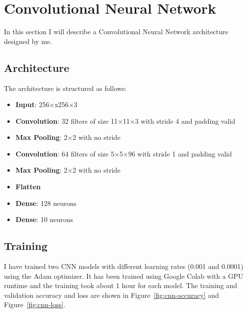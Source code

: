 \section{Convolutional Neural Network}\label{sec:cnn}
In this section I will describe a Convolutional Neural Network architecture designed by me.

\subsection{Architecture}\label{sec:cnn-architecture}
The architecture is structured as follows:
\begin{itemize}
    \item \textbf{Input}: 256$\times$x256$\times$3
    \item \textbf{Convolution}: 32 filters of size 11$\times$11$\times$3 with stride 4 and padding valid
    \item \textbf{Max Pooling}: 2$\times$2 with no stride
    \item \textbf{Convolution}: 64 filters of size 5$\times$5$\times$96 with stride 1 and padding valid
    \item \textbf{Max Pooling}: 2$\times$2 with no stride
    \item \textbf{Flatten}
    \item \textbf{Dense}: 128 neurons
    \item \textbf{Dense}: 10 neurons
\end{itemize}

\subsection{Training}\label{sec:cnn-training}
I have trained two CNN models with different learning rates (0.001 and 0.0001) using the Adam optimizer.
It has been trained using Google Colab with a GPU runtime and the training took about 1 hour for each model.
The training and validation accuracy and loss are shown in Figure~\ref{fig:cnn-accuracy} and Figure~\ref{fig:cnn-loss}.

